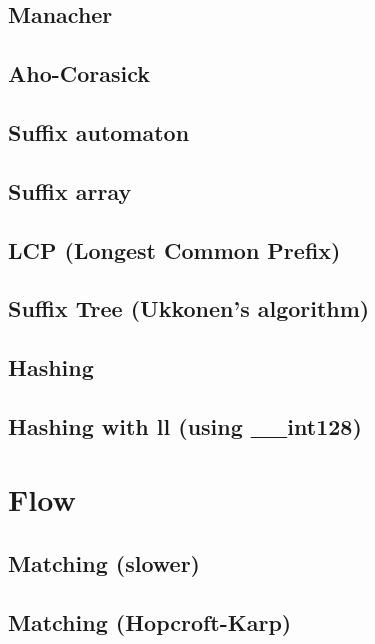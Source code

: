 \subsection{Manacher}
\subsection{Aho-Corasick}
\subsection{Suffix automaton}
\subsection{Suffix array}
\subsection{LCP (Longest Common Prefix)}
\subsection{Suffix Tree (Ukkonen's algorithm)}
\subsection{Hashing}
\subsection{Hashing with ll (using \_\_int128)}

\section{Flow}
\subsection{Matching (slower)}
\subsection{Matching (Hopcroft-Karp)}
